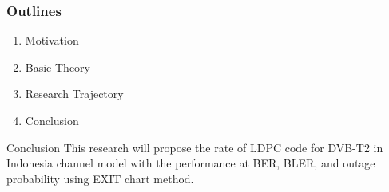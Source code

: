 \documentclass{beamer}
\begin{document}
\begin{frame}
\frametitle{Outlines}
\begin{enumerate}
\item Motivation
\item Basic Theory
\item Research Trajectory
\item \alert<+> {Conclusion} 
\end{enumerate}
\end{frame}
\begin{frame}{Conclusion}
This research will propose the rate of LDPC code for DVB-T2 in Indonesia channel model with the performance at BER, BLER, and outage probability using EXIT chart method. 

\end{frame}



\end{document}
